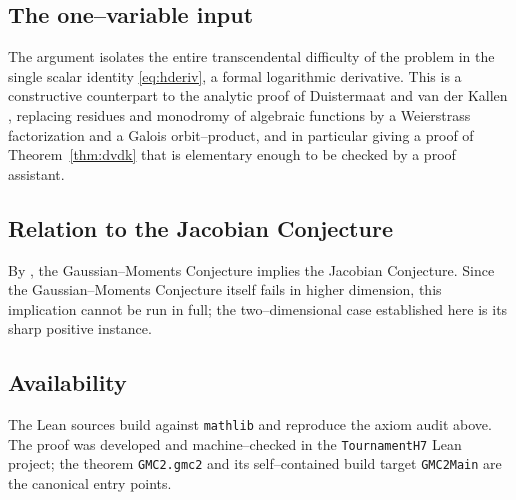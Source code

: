 \documentclass[11pt,reqno]{amsart}
\theoremstyle{plain}
\theoremstyle{definition}
\begin{document}
\subsection*{The one--variable input}
The argument isolates the entire transcendental difficulty of the problem in the single scalar identity
\eqref{eq:hderiv}, a formal logarithmic derivative. This is a constructive counterpart to the analytic
proof of Duistermaat and van der Kallen \cite{DvdK1998}, replacing residues and monodromy of algebraic
functions by a Weierstrass factorization and a Galois orbit--product, and in particular giving a proof
of Theorem~\ref{thm:dvdk} that is elementary enough to be checked by a proof assistant.

\subsection*{Relation to the Jacobian Conjecture}
By \cite{DerksenEssenZhao2017}, the Gaussian--Moments Conjecture implies the Jacobian Conjecture. Since
the Gaussian--Moments Conjecture itself fails in higher dimension, this implication cannot be run in
full; the two--dimensional case established here is its sharp positive instance.

\subsection*{Availability}
The Lean sources build against \texttt{mathlib} and reproduce the axiom audit above. The proof was
developed and machine--checked in the \texttt{TournamentH7} Lean project; the theorem \texttt{GMC2.gmc2}
and its self--contained build target \texttt{GMC2Main} are the canonical entry points.
\end{document}
